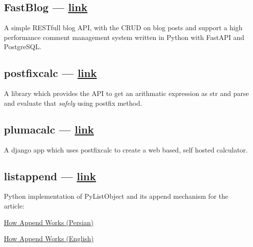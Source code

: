 \begin{multicols}{2}
\subsection{{FastBlog --- \href{https://github.com/mahdihaghverdi/FastBlog/}{link}}}
\begin{zitemize}
\item A simple RESTfull blog API, with the CRUD on blog posts and support a high performance comment management system written in Python with FastAPI and PostgreSQL.
\end{zitemize}

\subsection{{postfixcalc --- \href{https://github.com/mahdihaghverdi/postfixcalc}{link}}}
\begin{zitemize}
\item A library which provides the API to get an arithmatic expression as {\ttfamily str} and parse and evaluate that \textit{safely} using postfix method.
\end{zitemize}

\subsection{{plumacalc --- \href{https://github.com/mahdihaghverdi/plumacalc}{link}}}
\begin{zitemize}
\item A django app which uses postfixcalc to create a web based, self hosted calculator.
\end{zitemize}

\subsection{{listappend --- \href{https://github.com/mahdihaghverdi/listappend}{link}}}
\begin{zitemize}
\item Python implementation of {\ttfamily PyListObject} and its {\ttfamily append}  mechanism for the article:
\begin{zitemize}
\item
\href {https://virgool.io/@liewpl/how-append-works-gp4apwtpr0bt}{How Append Works (Persian)}
\item \href{https://medium.com/@mahdihaghverdi/how-list-append-is-implemented-in-c-layer-of-cpython-interpreter-bf88632819c0}{How Append Works (English)}
\end{zitemize}
\end{zitemize}


\end{multicols}
